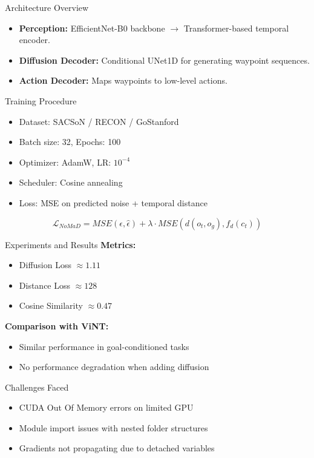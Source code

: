 \documentclass{beamer}
\begin{document}
\begin{frame}{Architecture Overview}
\begin{itemize}
    \item \textbf{Perception:} EfficientNet-B0 backbone $\rightarrow$ Transformer-based temporal encoder.
    \item \textbf{Diffusion Decoder:} Conditional UNet1D for generating waypoint sequences.
    \item \textbf{Action Decoder:} Maps waypoints to low-level actions.
\end{itemize}
\end{frame}

\begin{frame}{Training Procedure}
\begin{itemize}
    \item Dataset: SACSoN / RECON / GoStanford
    \item Batch size: 32, Epochs: 100
    \item Optimizer: AdamW, LR: $10^{-4}$
    \item Scheduler: Cosine annealing
    \item Loss: MSE on predicted noise + temporal distance
\end{itemize}
\[ \mathcal{L}_{NoMaD} = MSE(\epsilon, \hat{\epsilon}) + \lambda \cdot MSE(d(o_t, o_g), f_d(c_t)) \]
\end{frame}

\begin{frame}{Experiments and Results}
\textbf{Metrics:}
\begin{itemize}
    \item Diffusion Loss $\approx 1.11$
    \item Distance Loss $\approx 128$
    \item Cosine Similarity $\approx 0.47$
\end{itemize}
\textbf{Comparison with ViNT:}
\begin{itemize}
    \item Similar performance in goal-conditioned tasks
    \item No performance degradation when adding diffusion
\end{itemize}
\end{frame}

\begin{frame}{Challenges Faced}
\begin{itemize}
    \item CUDA Out Of Memory errors on limited GPU
    \item Module import issues with nested folder structures
    \item Gradients not propagating due to detached variables
\end{itemize}
\end{frame}
\end{document}
